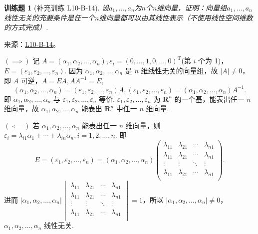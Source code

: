 \documentclass[12pt,fontset=fandol]{ctexart}
\newtheorem{exercise}{训练题}[section]
\begin{document}
\begin{exercise}[补充训练 L10-B-14]\label{prob:L10-B-14}
设$a_1,\ldots,a_n$为$n$个$n$维向量，证明：向量组$a_1,\ldots,a_n$线性无关的充要条件是任一个$n$维向量都可以由其线性表示（不使用线性空间维数的方式完成）.
\end{exercise}
\noindent 来源：\href{https://github.com/yhwu-is/Linear-Algebra-Left-Undone/blob/new/%E8%AE%B2%E4%B9%89/%E4%B8%93%E9%A2%98/10%20%E8%A1%8C%E5%88%97%E5%BC%8F.tex}{L10-B-14}。
\begin{solve}
$(\implies)$ 记 $A = (\alpha_1, \alpha_2, \ldots, \alpha_n), \varepsilon_i = (0, \ldots, 1, 0, \ldots, 0)^{\mathrm{T}}$(第 $i$ 个为 1)，$E = (\varepsilon_1, \varepsilon_2, \ldots, \varepsilon_n)$. 因为 $\alpha_1, \alpha_2, \ldots, \alpha_n$ 是 $n$ 维线性无关的向量组，故 $\lvert A \rvert \neq 0$，即 $A$ 可逆，$A = EA, AA^{-1} = E$,\[(\alpha_1, \alpha_2, \ldots, \alpha_n) = (\varepsilon_1, \varepsilon_2, \ldots, \varepsilon_n)A, (\varepsilon_1, \varepsilon_2, \ldots, \varepsilon_n) = (\alpha_1, \alpha_2, \ldots, \alpha_n)A^{-1}.\] 即 $\alpha_1, \alpha_2, \ldots, \alpha_n$ 与 $\varepsilon_1, \varepsilon_2, \ldots, \varepsilon_n$ 等价. $\varepsilon_1, \varepsilon_2, \ldots, \varepsilon_n$ 为 $\mathbf{R}^n$ 的一个基，能表出任一 $n$ 维向量，故 $\alpha_1, \alpha_2, \ldots, \alpha_n$ 能表出 $\mathbf{R}^n$ 中任一 $n$ 维向量.

            $(\impliedby)$ 若 $\alpha_1, \alpha_2, \ldots, \alpha_n$ 能表出任一 $n$ 维向量，则 $\varepsilon_i = \lambda_{i1}\alpha_1+\cdots+\lambda_{in}\alpha_n, i = 1, 2, \ldots, n$. 即
            \[E = (\varepsilon_1, \varepsilon_2, \ldots, \varepsilon_n) = (\alpha_1, \alpha_2, \ldots, \alpha_n)\begin{pmatrix}
                    \lambda_{11} & \lambda_{21} & \cdots & \lambda_{n1} \\
                    \lambda_{11} & \lambda_{21} & \cdots & \lambda_{n1} \\
                    \vdots       & \vdots       & \ddots & \vdots       \\
                    \lambda_{11} & \lambda_{21} & \cdots & \lambda_{n1} \\
                \end{pmatrix}.\]
            进而 $\lvert \alpha_1, \alpha_2, \ldots, \alpha_n \rvert \begin{vmatrix}
                    \lambda_{11} & \lambda_{21} & \cdots & \lambda_{n1} \\
                    \lambda_{11} & \lambda_{21} & \cdots & \lambda_{n1} \\
                    \vdots       & \vdots       & \ddots & \vdots       \\
                    \lambda_{11} & \lambda_{21} & \cdots & \lambda_{n1} \\
                \end{vmatrix} = 1$，所以 $\lvert \alpha_1, \alpha_2, \ldots, \alpha_n \rvert \neq 0$，$\alpha_1, \alpha_2, \ldots, \alpha_n$ 线性无关.
\end{solve}
\end{document}
